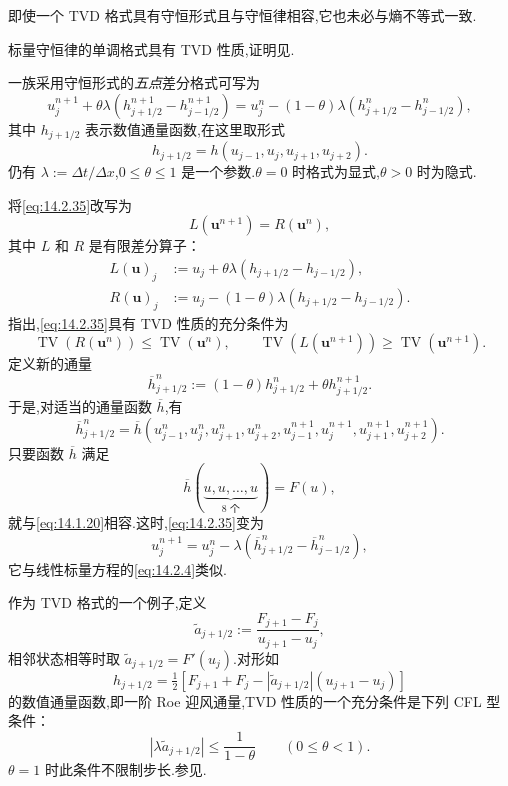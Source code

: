 即使一个 TVD 格式具有守恒形式且与守恒律相容,它也未必与熵不等式一致.

标量守恒律的单调格式具有 TVD 性质,证明见.

一族采用守恒形式的\emph{五点}差分格式可写为
\begin{equation}\label{eq:14.2.35}
  u_j^{n+1}+\theta\lambda(h_{j+1/2}^{n+1}-h_{j-1/2}^{n+1})
    =u_j^n-(1-\theta)\lambda(h_{j+1/2}^n-h_{j-1/2}^n),
\end{equation}
其中 \(h_{j+1/2}\) 表示数值通量函数,在这里取形式
\[
  h_{j+1/2}=h(u_{j-1},u_j,u_{j+1},u_{j+2}).
\]
仍有 \(\lambda:=\Delta t/\Delta x\),\(0\le\theta\le1\) 是一个参数.\(\theta=0\) 时格式为显式,\(\theta>0\) 时为隐式.

将\eqref{eq:14.2.35}改写为
\[
  L(\boldsymbol{u}^{n+1})=R(\boldsymbol{u}^n),
\]
其中 \(L\) 和 \(R\) 是有限差分算子：
\[
  \begin{aligned}
    L(\boldsymbol{u})_j&:=u_j+\theta\lambda(h_{j+1/2}-h_{j-1/2}),\\
    R(\boldsymbol{u})_j&:=u_j-(1-\theta)\lambda(h_{j+1/2}-h_{j-1/2}).
  \end{aligned}
\]
指出,\eqref{eq:14.2.35}具有 TVD 性质的充分条件为
\[
  \operatorname{TV}(R(\boldsymbol{u}^n))\le\operatorname{TV}(\boldsymbol{u}^n),\qquad
  \operatorname{TV}(L(\boldsymbol{u}^{n+1}))\ge\operatorname{TV}(\boldsymbol{u}^{n+1}).
\]
定义新的通量
\begin{equation}\label{eq:14.2.36}
  \overline h_{j+1/2}^n:=(1-\theta)h_{j+1/2}^n+\theta h_{j+1/2}^{n+1}.
\end{equation}
于是,对适当的通量函数 \(\overline h\),有
\[
  \overline h_{j+1/2}^n
    =\overline h(u_{j-1}^n,u_j^n,u_{j+1}^n,u_{j+2}^n,
                u_{j-1}^{n+1},u_j^{n+1},u_{j+1}^{n+1},u_{j+2}^{n+1}).
\]
只要函数 \(\overline h\) 满足
\begin{equation}\label{eq:14.2.37}
  \overline h(\underbrace{u,u,\ldots,u}_{8\text{ 个}})=F(u),
\end{equation}
就与\eqref{eq:14.1.20}相容.这时,\eqref{eq:14.2.35}变为
\begin{equation}\label{eq:14.2.38}
  u_j^{n+1}=u_j^n-\lambda(\overline h_{j+1/2}^n-\overline h_{j-1/2}^n),
\end{equation}
它与线性标量方程的\eqref{eq:14.2.4}类似.

\begin{example}\label{ex:14.2.roe}
作为 TVD 格式的一个例子,定义
\[
  \widetilde a_{j+1/2}:=\frac{F_{j+1}-F_j}{u_{j+1}-u_j},
\]
相邻状态相等时取 \(\widetilde a_{j+1/2}=F'(u_j)\).对形如
\begin{equation}\label{eq:14.2.39}
  h_{j+1/2}=\tfrac12[F_{j+1}+F_j-|\widetilde a_{j+1/2}|(u_{j+1}-u_j)]
\end{equation}
的数值通量函数,即一阶 Roe 迎风通量,TVD 性质的一个充分条件是下列 CFL 型条件：
\[
  |\lambda\widetilde a_{j+1/2}|\le\frac1{1-\theta}\qquad(0\le\theta<1).
\]
\(\theta=1\) 时此条件不限制步长.参见.
\end{example}

